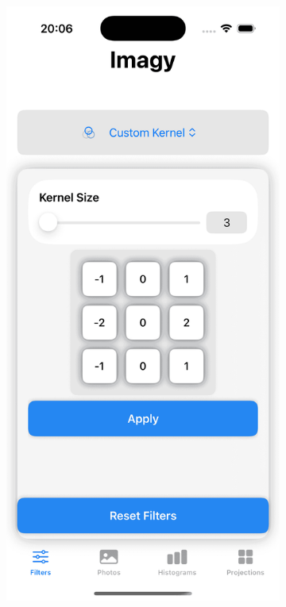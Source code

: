 \documentclass[a4paper]{article}
\begin{document}
\begin{figure}[H]
    \centering
    \begin{subfigure}{0.2\textwidth}
        \centering
        \includegraphics[width=\linewidth]{images/custom_horizontal.png}

\end{subfigure}
\end{figure}
\end{document}
